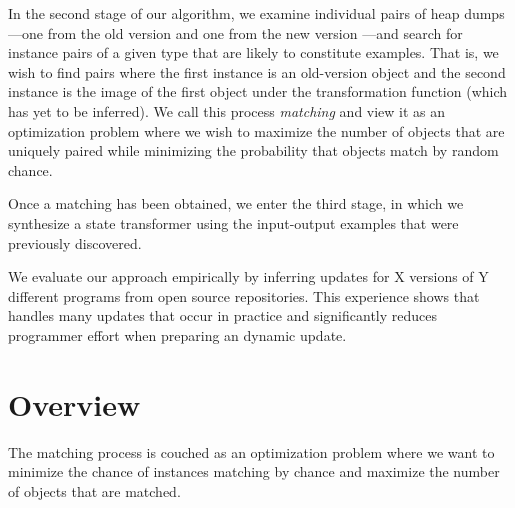 In the second stage of our algorithm, we examine individual pairs of
heap dumps---one from the old version and one from the new version%
---and search for instance pairs of a given type that are likely to
constitute examples.  That is, we wish to find pairs where the first
instance is an old-version object and the second instance is the image
of the first object under the transformation function (which has yet
to be inferred).  We call this process \emph{matching} and view it as
an optimization problem where we wish to maximize the number of
objects that are uniquely paired while minimizing the probability that
objects match by random chance.

Once a matching has been obtained, we enter the third stage, in which
we synthesize a state transformer using the input-output examples that
were previously discovered.


We evaluate our approach empirically by inferring updates for X versions of
  Y different programs from open source repositories.  This experience
  shows that \TOS handles many updates that occur in practice and
  significantly reduces programmer effort when preparing an dynamic
  update.

\section{Overview}

The matching process is couched as an optimization problem where we
want to minimize the chance of instances matching by chance and maximize
the number of objects that are matched.





